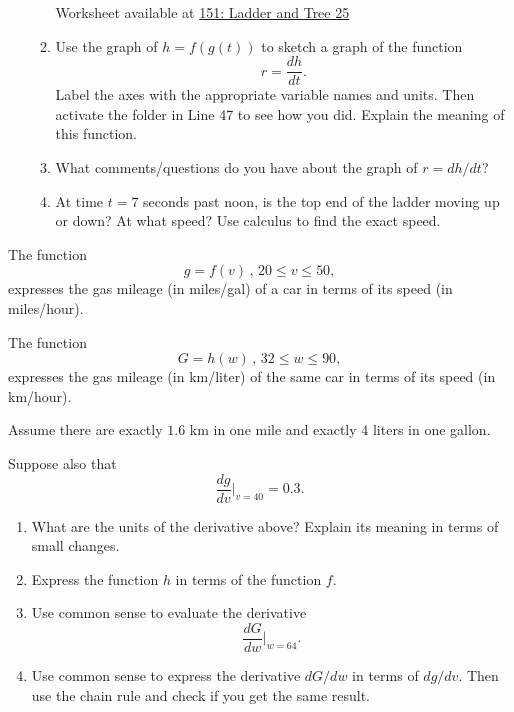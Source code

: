 \documentclass{ximera}
\begin{document}
\begin{question}
\begin{enumerate}
\begin{enumerate}
Worksheet available at \href{https://www.desmos.com/calculator/duq8yqxozk}{151: Ladder and Tree 25} 


\item Use the graph of $h=f(g(t))$ to sketch a graph of the function
\[
  r = \frac{dh}{dt} .
\]
Label the axes with the appropriate variable names and units. Then activate the folder in Line 47 to see how you did. Explain the meaning of this function.

\item What comments/questions do you have about the graph of $r=dh/dt$?

\item At time $t=7$ seconds past noon, is the top end of the ladder moving up or down? At what speed? Use calculus to find the exact speed.


\end{enumerate}
\end{enumerate}
\end{question}

\begin{question}  \label{QPDFefrdffd}
The function
\[
        g = f(v) \, , \, 20\leq v \leq 50 ,
\]
expresses the gas mileage (in miles/gal) of a car in terms of its speed (in miles/hour).

The function 
\[
    G = h(w) \, , \, 32 \leq w \leq 90 ,
\] 
expresses the gas mileage (in km/liter) of the same car in terms of its speed (in km/hour).

Assume there are exactly $1.6$ km in one mile and exactly $4$ liters in one gallon.

Suppose also that 
\[
   \frac{dg}{dv}\Big|_{v=40} = 0.3 .
\]

\begin{enumerate}
\item What are the units of the derivative above? Explain its meaning in terms of small changes.

\item Express the function $h$ in terms of the function $f$.

\item Use common sense to evaluate the derivative
\[
          \frac{dG}{dw}\Big|_{w=64}.
\]

\item Use common sense to express the derivative $dG/dw$ in terms of $dg/dv$. Then use the chain rule and check if you get the same result. 
\end{enumerate}
\end{question}
\end{document}
